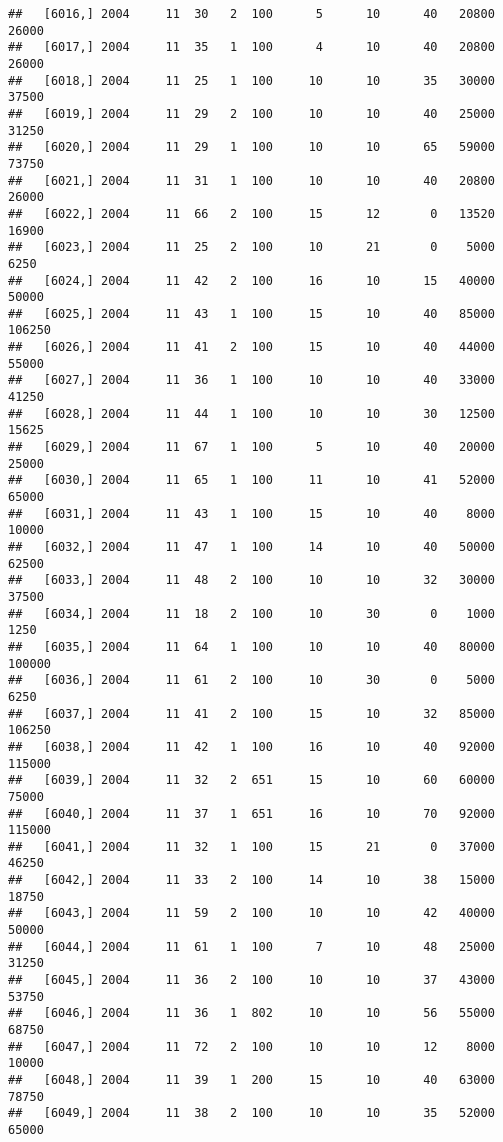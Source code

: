 \documentclass{article}\usepackage[]{graphicx}\usepackage[]{color}
\makeatletter
\newenvironment{kframe}{%
 \def\at@end@of@kframe{}%
 \ifinner\ifhmode%
  \def\at@end@of@kframe{\end{minipage}}%
  \begin{minipage}{\columnwidth}%
 \fi\fi%
 \def\FrameCommand##1{\hskip\@totalleftmargin \hskip-\fboxsep
 \colorbox{shadecolor}{##1}\hskip-\fboxsep
     \hskip-\linewidth \hskip-\@totalleftmargin \hskip\columnwidth}%
 \MakeFramed {\advance\hsize-\width
   \@totalleftmargin\z@ \linewidth\hsize
   \@setminipage}}%
 {\par\unskip\endMakeFramed%
 \at@end@of@kframe}
\newenvironment{knitrout}{}{} %
\makeatother
\begin{document}
\begin{knitrout}
\begin{kframe}
\begin{verbatim}
##   [6016,] 2004     11  30   2  100      5      10      40   20800   26000
##   [6017,] 2004     11  35   1  100      4      10      40   20800   26000
##   [6018,] 2004     11  25   1  100     10      10      35   30000   37500
##   [6019,] 2004     11  29   2  100     10      10      40   25000   31250
##   [6020,] 2004     11  29   1  100     10      10      65   59000   73750
##   [6021,] 2004     11  31   1  100     10      10      40   20800   26000
##   [6022,] 2004     11  66   2  100     15      12       0   13520   16900
##   [6023,] 2004     11  25   2  100     10      21       0    5000    6250
##   [6024,] 2004     11  42   2  100     16      10      15   40000   50000
##   [6025,] 2004     11  43   1  100     15      10      40   85000  106250
##   [6026,] 2004     11  41   2  100     15      10      40   44000   55000
##   [6027,] 2004     11  36   1  100     10      10      40   33000   41250
##   [6028,] 2004     11  44   1  100     10      10      30   12500   15625
##   [6029,] 2004     11  67   1  100      5      10      40   20000   25000
##   [6030,] 2004     11  65   1  100     11      10      41   52000   65000
##   [6031,] 2004     11  43   1  100     15      10      40    8000   10000
##   [6032,] 2004     11  47   1  100     14      10      40   50000   62500
##   [6033,] 2004     11  48   2  100     10      10      32   30000   37500
##   [6034,] 2004     11  18   2  100     10      30       0    1000    1250
##   [6035,] 2004     11  64   1  100     10      10      40   80000  100000
##   [6036,] 2004     11  61   2  100     10      30       0    5000    6250
##   [6037,] 2004     11  41   2  100     15      10      32   85000  106250
##   [6038,] 2004     11  42   1  100     16      10      40   92000  115000
##   [6039,] 2004     11  32   2  651     15      10      60   60000   75000
##   [6040,] 2004     11  37   1  651     16      10      70   92000  115000
##   [6041,] 2004     11  32   1  100     15      21       0   37000   46250
##   [6042,] 2004     11  33   2  100     14      10      38   15000   18750
##   [6043,] 2004     11  59   2  100     10      10      42   40000   50000
##   [6044,] 2004     11  61   1  100      7      10      48   25000   31250
##   [6045,] 2004     11  36   2  100     10      10      37   43000   53750
##   [6046,] 2004     11  36   1  802     10      10      56   55000   68750
##   [6047,] 2004     11  72   2  100     10      10      12    8000   10000
##   [6048,] 2004     11  39   1  200     15      10      40   63000   78750
##   [6049,] 2004     11  38   2  100     10      10      35   52000   65000

\end{verbatim}
\end{kframe}
\end{knitrout}
\end{document}
